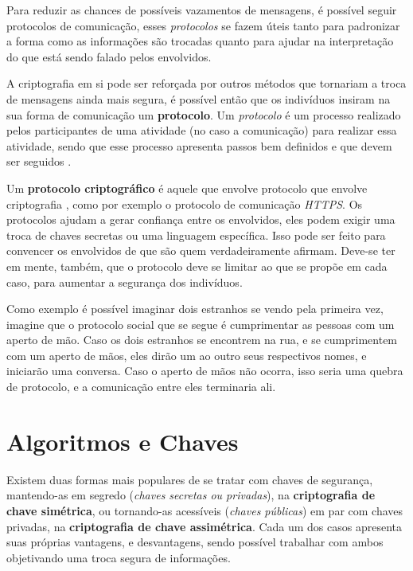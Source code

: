 	Para reduzir as chances de possíveis vazamentos de mensagens, é possível seguir protocolos de comunicação, esses \textit{protocolos} se fazem úteis tanto para padronizar a forma como as informações são trocadas quanto para ajudar na interpretação do que está sendo falado pelos envolvidos.
	
	A criptografia em si pode ser reforçada por outros métodos que tornariam a troca de mensagens ainda mais segura, é possível então que os indivíduos insiram na sua forma de comunicação um \textbf{protocolo}. Um \textit{protocolo} é um processo realizado pelos participantes de uma atividade (no caso a comunicação) para realizar essa atividade, sendo que esse processo apresenta passos bem definidos e que devem ser seguidos \cite{schneier96}.
	
	Um \textbf{protocolo criptográfico} é aquele que envolve protocolo que envolve criptografia \cite[p.~31]{schneier96}, como por exemplo o protocolo de comunicação \textit{HTTPS}. Os protocolos ajudam a gerar confiança entre os envolvidos, eles podem exigir uma troca de chaves secretas ou uma linguagem específica. Isso pode ser feito para convencer os envolvidos de que são quem verdadeiramente afirmam. Deve-se ter em mente, também, que o protocolo deve se limitar ao que se propõe em cada caso, para aumentar a segurança dos indivíduos.
	
	Como exemplo é possível imaginar dois estranhos se vendo pela primeira vez, imagine que o protocolo social que se segue é cumprimentar as pessoas com um aperto de mão. Caso os dois estranhos se encontrem na rua, e se cumprimentem com um aperto de mãos, eles dirão um ao outro seus respectivos nomes, e iniciarão uma conversa. Caso o aperto de mãos não ocorra, isso seria uma quebra de protocolo, e a comunicação entre eles terminaria ali.

\section[Algoritmos e Chaves]{Algoritmos e Chaves}

	Existem duas formas mais populares de se tratar com chaves de segurança, mantendo-as em segredo (\textit{chaves secretas ou privadas}), na \textbf{criptografia de chave simétrica}, ou tornando-as acessíveis (\textit{chaves públicas}) em par com chaves privadas, na \textbf{criptografia de chave assimétrica}. Cada um dos casos apresenta suas próprias vantagens, e desvantagens, sendo possível trabalhar com ambos objetivando uma troca segura de informações.
	
